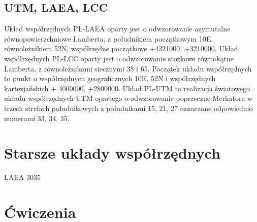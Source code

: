 \documentclass[a4paper,11pt, onecolumn, openany]{memoir}
\begin{document}
			\subsection{UTM, LAEA, LCC}
			Układ współrzędnych PL-LAEA oparty jest o odwzorowanie azymutalne równopowierzchniowe Lamberta, z południkiem początkowym 10E, równoleżnikiem 52N, współrzędne początkowe +4321000, +3210000.
			Układ współrzędnych PL-LCC oparty jest o odwzorowanie stożkowe równokątne Lamberta, z równoleżnikami siecznymi 35 i 65. Początek układu współrzędnych to punkt o współrzędnych geograficznych 10E, 52N i współrzędnych kartezjańskich + 4000000, +2800000.
			Układ PL-UTM to realizacja światowego układu współrzędnych UTM opartego o odwzorowanie poprzeczne Merkatora w trzech strefach południkowych z południkami 15, 21, 27 oznaczane odpowiednio numerami 33, 34, 35.
		\section{Starsze układy współrzędnych}
		
		LAEA 3035
		\section{Ćwiczenia}
\end{document}
